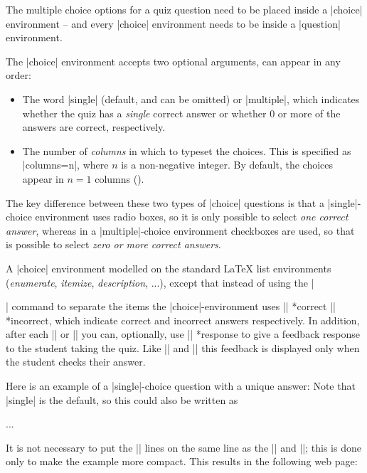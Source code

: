 \documentclass[svgnames]{article}
\begin{document}
  The multiple choice options for a quiz question need to be placed inside
  a \LatexCode|choice| environment -- and every \LatexCode|choice|
  environment needs to be inside a \LatexCode|question| environment.

  The \LatexCode|choice| environment accepts two optional arguments,
  can appear in any order:
  \begin{itemize}
    \item{}
    The word \LatexCode|single| (default, and can be omitted) or
    \LatexCode|multiple|, which indicates whether the quiz has a
    \textit{single} correct answer or whether 0 or more of the answers are
    correct, respectively.
    \item {}
    The number of \textit{columns} in which to typeset the choices. This
    is specified as \LatexCode|columns=n|, where $n$ is a non-negative integer.
    By default, the choices appear in $n=1$ columns
    ().
  \end{itemize}
  The key difference between these two types of \LatexCode|choice|
  questions is that a \LatexCode|single|-choice environment uses radio
  boxes, so it is only possible to select \textit{one correct answer}, whereas in a
  \LatexCode|multiple|-choice environment checkboxes are used, so that is
  possible to select \textit{zero or more correct answers}.

  A \LatexCode|choice| environment modelled on the standard
  \LaTeX{} list environments (\textit{enumerate}, \textit{itemize},
  \textit{description}, ...), except that instead of using the
  \LatexCode|\item| command to separate the items the
  \LatexCode|choice|-environment uses \LatexCode|\correct|
  *{correct} \LatexCode|\incorrect|
  *{incorrect}, which indicate correct
  and incorrect answers respectively.  In addition, after each
  \LatexCode|\correct| or \LatexCode|\incorrect| you can, optionally, use
  \LatexCode|\response| *{response} to give
  a feedback response to the student taking the quiz. Like
  \LatexCode|\whenRight| and \LatexCode|\whenWrong| this feedback is
  displayed only when the student checks their answer.

  Here is an example of a \LatexCode|single|-choice question with a unique
  answer:
  Note that \LatexCode|single| is the default, so this could also be written as
  \begin{latexcode}
    \begin{choice}[columns=3, single]
      ...
    \end{choice}
  \end{latexcode}
  It is not necessary to put the \LatexCode|\response| lines on the same
  line as the \LatexCode|\incorrect| and \LatexCode|\incorrect|; this is
  done only to make the example more compact. This results in the
  following web page:
\end{document}
